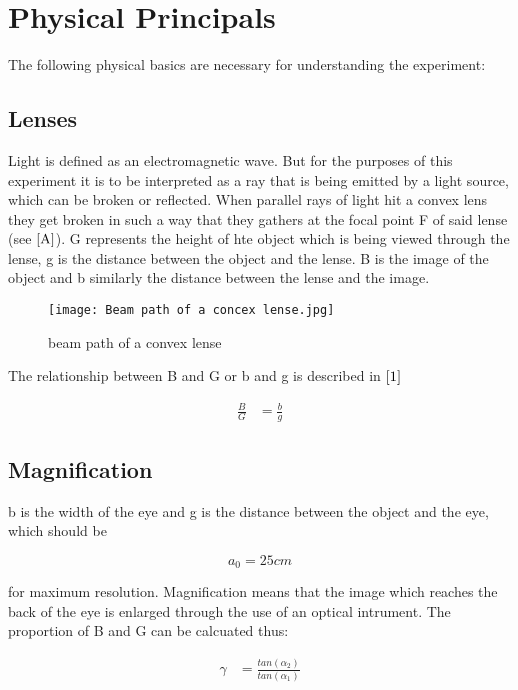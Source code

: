 \section{Physical Principals}

The following physical basics are necessary for understanding the experiment:

\subsection{Lenses}

Light is defined as an electromagnetic wave. But for the purposes of this experiment it is to be interpreted as a ray 
that is being emitted by a light source, which can be broken or reflected. When parallel rays of light hit a convex lens they get broken 
in such a way that they gathers at the focal point F of said lense (see $\ref{A}$). G represents the height of hte object which is being 
viewed through the lense, g is the distance between the object and the lense. B is the image of the object and b similarly the distance between 
the lense and the image. 

\label{A}
\begin{figure}[h!]
    \centering
  \texttt{[image: Beam path of a concex lense.jpg]}
  \caption{beam path of a convex lense}
  \end{figure}

The relationship between B and G or b and g is described in $\ref{1}$

\label{1}
\begin{align*}
    \frac{B}{G} & = \frac{b}{g} \tag{1}
\end{align*}

\subsection{Magnification}

b is the width of the eye and g is the distance between the object and the eye, which should be 

\begin{equation}
a_{0} = 25 cm 
\end{equation}

for maximum resolution. Magnification means that the image which reaches the back of the eye is enlarged through the use 
of an optical intrument. The proportion of B and G can be calcuated thus:

\label{2}
\begin{align*}
    \gamma & = \frac{tan(\alpha_{2})}{tan(\alpha_{1})} \tag{1}
\end{align*}



